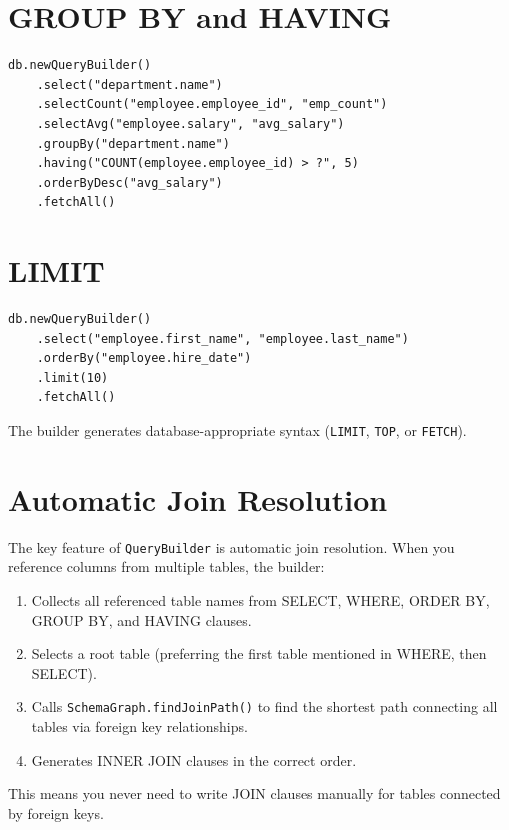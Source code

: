 \section{GROUP BY and HAVING}
\label{sec:qb-groupby}

\begin{lstlisting}[style=groovy]
db.newQueryBuilder()
    .select("department.name")
    .selectCount("employee.employee_id", "emp_count")
    .selectAvg("employee.salary", "avg_salary")
    .groupBy("department.name")
    .having("COUNT(employee.employee_id) > ?", 5)
    .orderByDesc("avg_salary")
    .fetchAll()
\end{lstlisting}

\section{LIMIT}
\label{sec:qb-limit}

\begin{lstlisting}[style=groovy]
db.newQueryBuilder()
    .select("employee.first_name", "employee.last_name")
    .orderBy("employee.hire_date")
    .limit(10)
    .fetchAll()
\end{lstlisting}

\noindent
The builder generates database-appropriate syntax (\texttt{LIMIT}, \texttt{TOP}, or \texttt{FETCH}).

\section{Automatic Join Resolution}
\label{sec:qb-auto-join}

The key feature of \texttt{QueryBuilder} is automatic join resolution.  When you reference columns from multiple tables, the builder:

\begin{enumerate}
  \item Collects all referenced table names from SELECT, WHERE, ORDER BY, GROUP BY, and HAVING clauses.
  \item Selects a root table (preferring the first table mentioned in WHERE, then SELECT).
  \item Calls \texttt{SchemaGraph.findJoinPath()} to find the shortest path connecting all tables via foreign key relationships.
  \item Generates INNER JOIN clauses in the correct order.
\end{enumerate}

\noindent
This means you never need to write JOIN clauses manually for tables connected by foreign keys.


